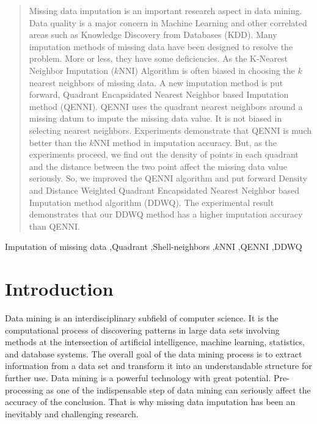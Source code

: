 \documentclass[print]{jicspack}
\begin{document}
\begin{premaker}
\begin{abstract}
Missing data imputation is an important research aspect in data mining. Data quality is a major concern in Machine Learning and other correlated areas such as Knowledge Discovery from Databases (KDD). Many imputation methods of missing data have been designed to resolve the problem. More or less, they have some deficiencies. As the K-Nearest Neighbor Imputation ($k$NNI) Algorithm is often biased in choosing the $k$ nearest neighbors of missing data. A new imputation method is put forward, Quadrant Encapsidated Nearest Neighbor based Imputation method (QENNI). QENNI uses the quadrant nearest neighbors around a missing datum to impute the missing data value. It is not biased in selecting nearest neighbors. Experiments demonstrate that QENNI is much better than the $k$NNI method in imputation accuracy. But, as the experiments proceed, we find out the density of points in each quadrant and the distance between the two point affect the missing data value seriously. So, we improved the QENNI algorithm and put forward Density and Distance Weighted Quadrant Encapsidated Nearest Neighbor based Imputation method algorithm (DDWQ). The experimental result demonstrates that our DDWQ method has a higher imputation accuracy than QENNI.
\end{abstract}
\begin{keyword}
Imputation of missing data \sep Quadrant \sep Shell-neighbors  \sep $k$NNI \sep QENNI \sep DDWQ
\end{keyword}
\end{premaker}

\section{Introduction}
\label{Maintext}
Data mining is an interdisciplinary subfield of computer science. It is the computational process of discovering patterns in large data sets involving methods at the intersection of artificial intelligence, machine learning, statistics, and database systems. The overall goal of the data mining process is to extract information from a data set and transform it into an understandable structure for further use. Data mining is a powerful technology with great potential. Pre-processing as one of the indispensable step of data mining can seriously affect the accuracy of the conclusion. That is why missing data imputation has been an inevitably and challenging research.
\end{document}
